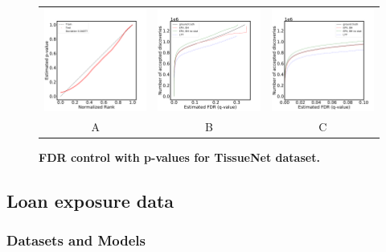 \documentclass{article}
\begin{document}
\begin{figure}
	\centering
	\begin{tabular}{ccc}
 		\includegraphics[width=2in]{img/segment_cls_QQ.pdf} &
		\includegraphics[width=2in]{img/segment_cls_fdr_control.pdf} & 
            \includegraphics[width=2in]{img/segment_cls_fdr_control_loc.pdf}
		\\	
		A & B & C
	\end{tabular}
	\caption{\bf FDR control with p-values for TissueNet dataset.}
	\label{fig:pcam}
\end{figure}

\subsection{Loan exposure data}

\subsubsection{Datasets and Models}
\end{document}
